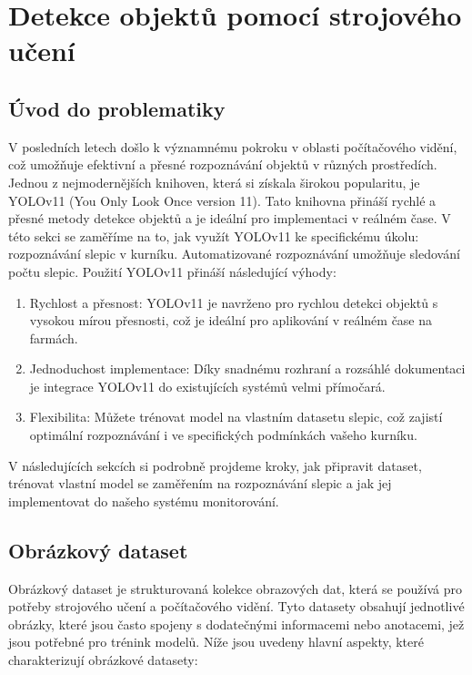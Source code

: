 \section{Detekce objektů pomocí strojového učení}\label{sec:detekce-objektu-pomoci-strojoveho-uceni}


\subsection*{Úvod do problematiky}\label{subsec:uvod-do-problematiky}
V posledních letech došlo k významnému pokroku v oblasti počítačového vidění, což umožňuje efektivní a přesné rozpoznávání objektů v různých prostředích.
Jednou z nejmodernějších knihoven, která si získala širokou popularitu, je YOLOv11 (You Only Look Once version 11).
Tato knihovna přináší rychlé a přesné metody detekce objektů a je ideální pro implementaci v reálném čase.
V této sekci se zaměříme na to, jak využít YOLOv11 ke specifickému úkolu: rozpoznávání slepic v kurníku.
Automatizované rozpoznávání umožňuje sledování počtu slepic.
Použití YOLOv11 přináší následující výhody:

\begin{enumerate}
    \item Rychlost a přesnost: YOLOv11 je navrženo pro rychlou detekci objektů s vysokou mírou přesnosti, což je ideální pro aplikování v reálném čase na farmách.
    \item Jednoduchost implementace: Díky snadnému rozhraní a rozsáhlé dokumentaci je integrace YOLOv11 do existujících systémů velmi přímočará.
    \item Flexibilita: Můžete trénovat model na vlastním datasetu slepic, což zajistí optimální rozpoznávání i ve specifických podmínkách vašeho kurníku.
\end{enumerate}
V následujících sekcích si podrobně projdeme kroky, jak připravit dataset, trénovat vlastní model se zaměřením na rozpoznávání slepic a jak jej implementovat do našeho systému monitorování.

\subsection*{Obrázkový dataset}\label{subsec:obrazkovy-dataset}

Obrázkový dataset je strukturovaná kolekce obrazových dat, která se používá pro potřeby strojového učení a počítačového vidění.
Tyto datasety obsahují jednotlivé obrázky, které jsou často spojeny s dodatečnými informacemi nebo anotacemi, jež jsou potřebné pro trénink modelů.
Níže jsou uvedeny hlavní aspekty, které charakterizují obrázkové datasety:

